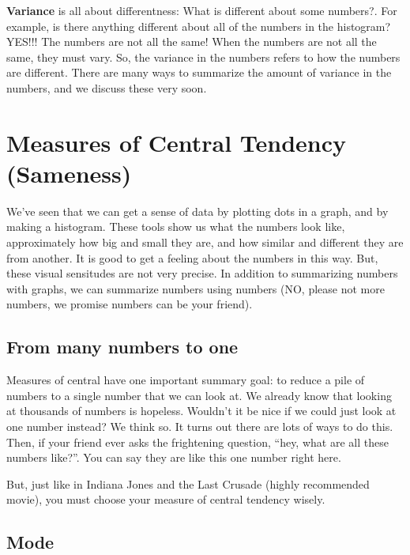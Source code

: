 \documentclass[
]{book}
\begin{document}
\textbf{Variance} is all about differentness: What is different about some numbers?. For example, is there anything different about all of the numbers in the histogram? YES!!! The numbers are not all the same! When the numbers are not all the same, they must vary. So, the variance in the numbers refers to how the numbers are different. There are many ways to summarize the amount of variance in the numbers, and we discuss these very soon.

\hypertarget{measures-of-central-tendency-sameness}{%
\section{Measures of Central Tendency (Sameness)}\label{measures-of-central-tendency-sameness}}

We've seen that we can get a sense of data by plotting dots in a graph, and by making a histogram. These tools show us what the numbers look like, approximately how big and small they are, and how similar and different they are from another. It is good to get a feeling about the numbers in this way. But, these visual sensitudes are not very precise. In addition to summarizing numbers with graphs, we can summarize numbers using numbers (NO, please not more numbers, we promise numbers can be your friend).

\hypertarget{from-many-numbers-to-one}{%
\subsection{From many numbers to one}\label{from-many-numbers-to-one}}

Measures of central have one important summary goal: to reduce a pile of numbers to a single number that we can look at. We already know that looking at thousands of numbers is hopeless. Wouldn't it be nice if we could just look at one number instead? We think so. It turns out there are lots of ways to do this. Then, if your friend ever asks the frightening question, ``hey, what are all these numbers like?''. You can say they are like this one number right here.

But, just like in Indiana Jones and the Last Crusade (highly recommended movie), you must choose your measure of central tendency wisely.

\hypertarget{mode}{%
\subsection{Mode}\label{mode}}
\end{document}
